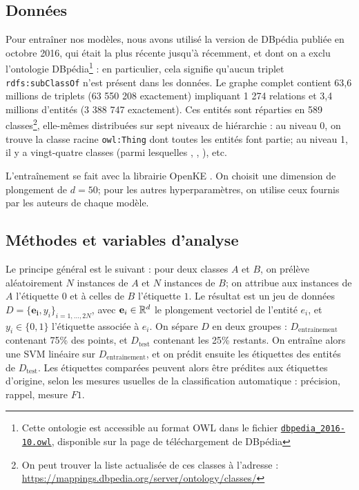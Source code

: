 \subsection{Données}
\label{subsec:kge-data-dbpedia}
Pour entraîner nos modèles, nous avons utilisé la version de DBpédia publiée en octobre 2016, qui était la plus récente jusqu'à récemment, et dont on a exclu l'ontologie DBpédia\footnote{Cette ontologie est accessible au format OWL dans le fichier \texttt{\href{http://downloads.dbpedia.org/2016-10/dbpedia\_2016-10.owl}{dbpedia\_2016-10.owl}}, disponible sur la page de téléchargement de DBpédia} : en particulier, cela signifie qu'aucun triplet \texttt{rdfs:subClassOf} n'est présent dans les données. Le graphe complet contient 63,6 millions de triplets (63 550 208 exactement) impliquant 1 274 relations et 3,4 millions d'entités (3 388 747 exactement). Ces entités sont réparties en 589 classes\footnote{On peut trouver la liste actualisée de ces classes à l'adresse : \href{mappings.dbpedia.org/server/ontology/classes/}{https://mappings.dbpedia.org/server/ontology/classes/}}, elle-mêmes distribuées sur sept niveaux de hiérarchie : au niveau 0, on trouve la classe racine \texttt{owl:Thing} dont toutes les entités font partie; au niveau 1, il y a vingt-quatre classes (parmi lesquelles , , ), etc. 

L'entraînement se fait avec la librairie OpenKE \cite{openke}. On choisit une dimension de plongement de $d=50$; pour les autres hyperparamètres, on utilise ceux fournis par les auteurs de chaque modèle.

\subsection{Méthodes et variables d'analyse}
\label{subsec:kge-sep-method}

Le principe général est le suivant : pour deux classes $A$ et $B$, on prélève aléatoirement $N$ instances de $A$ et $N$ instances de $B$; on attribue aux instances de $A$ l'étiquette $0$ et à celles de $B$ l'étiquette $1$. Le résultat est un jeu de données $D = \{\mathbf{e_i}, y_i \}_{i=1, \ldots, 2N}$, avec $\mathbf{e}_i \in \mathbb{R}^d$ le plongement vectoriel de l'entité $e_i$, et $y_i \in \{ 0, 1\}$ l'étiquette associée à $e_i$. 
On sépare $D$ en deux groupes : $D_\textrm{entraînement}$ contenant 75\% des points, et $D_\textrm{test}$ contenant les 25\% restants. On entraîne alors une SVM linéaire sur $D_\textrm{entraînement}$, et on prédit ensuite les étiquettes des entités de $D_\textrm{test}$.
Les étiquettes comparées peuvent alors être prédites aux étiquettes d'origine, selon les mesures usuelles de la classification automatique : précision, rappel, mesure $F1$. 

